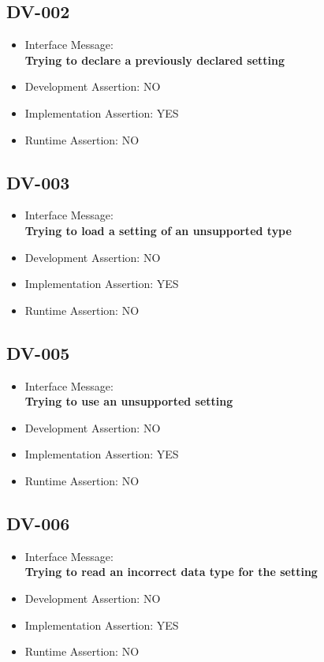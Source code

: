 \subsection{DV-002}
\begin{itemize}
  \item Interface Message:\\[1em]
    \textbf{Trying to declare a previously declared setting}
  \item Development Assertion: NO
  \item Implementation Assertion: YES
  \item Runtime Assertion: NO
\end{itemize}

\subsection{DV-003}
\begin{itemize}
  \item Interface Message:\\[1em]
    \textbf{Trying to load a setting of an unsupported type}
  \item Development Assertion: NO
  \item Implementation Assertion: YES
  \item Runtime Assertion: NO
\end{itemize}

\subsection{DV-005}
\begin{itemize}
  \item Interface Message:\\[1em]
    \textbf{Trying to use an unsupported setting}
  \item Development Assertion: NO
  \item Implementation Assertion: YES
  \item Runtime Assertion: NO
\end{itemize}

\subsection{DV-006}
\begin{itemize}
  \item Interface Message:\\[1em]
    \textbf{Trying to read an incorrect data type for the setting}
  \item Development Assertion: NO
  \item Implementation Assertion: YES
  \item Runtime Assertion: NO
\end{itemize}


